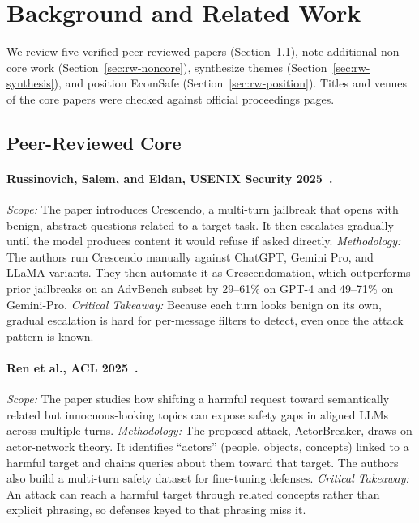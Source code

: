\documentclass[sigconf]{acmart}
\begin{document}
\section{Background and Related Work}
\label{sec:related}

We review five verified peer-reviewed papers (Section~\ref{sec:rw-core}), note additional non-core work (Section~\ref{sec:rw-noncore}), synthesize themes (Section~\ref{sec:rw-synthesis}), and position EcomSafe (Section~\ref{sec:rw-position}). Titles and venues of the core papers were checked against official proceedings pages.

\subsection{Peer-Reviewed Core}
\label{sec:rw-core}

\paragraph{Russinovich, Salem, and Eldan, USENIX Security 2025~\cite{russinovich2025crescendo}.}
\emph{Scope:} The paper introduces Crescendo, a multi-turn jailbreak that opens with benign, abstract questions related to a target task. It then escalates gradually until the model produces content it would refuse if asked directly.
\emph{Methodology:} The authors run Crescendo manually against ChatGPT, Gemini Pro, and LLaMA variants. They then automate it as Crescendomation, which outperforms prior jailbreaks on an AdvBench subset by 29--61\% on GPT-4 and 49--71\% on Gemini-Pro.
\emph{Critical Takeaway:} Because each turn looks benign on its own, gradual escalation is hard for per-message filters to detect, even once the attack pattern is known.

\paragraph{Ren et al., ACL 2025~\cite{ren2025llms}.}
\emph{Scope:} The paper studies how shifting a harmful request toward semantically related but innocuous-looking topics can expose safety gaps in aligned LLMs across multiple turns.
\emph{Methodology:} The proposed attack, ActorBreaker, draws on actor-network theory. It identifies ``actors'' (people, objects, concepts) linked to a harmful target and chains queries about them toward that target. The authors also build a multi-turn safety dataset for fine-tuning defenses.
\emph{Critical Takeaway:} An attack can reach a harmful target through related concepts rather than explicit phrasing, so defenses keyed to that phrasing miss it.
\end{document}

